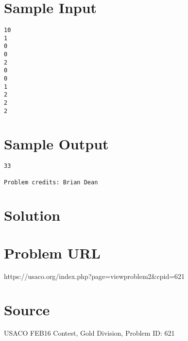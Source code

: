 \documentclass[12pt]{article}
\begin{document}
\section*{Sample Input}
\begin{verbatim}
10
1
0
0
2
0
0
1
2
2
2
\end{verbatim}

\section*{Sample Output}
\begin{verbatim}
33

Problem credits: Brian Dean
\end{verbatim}

\section*{Solution}


\section*{Problem URL}
https://usaco.org/index.php?page=viewproblem2&cpid=621

\section*{Source}
USACO FEB16 Contest, Gold Division, Problem ID: 621
\end{document}
